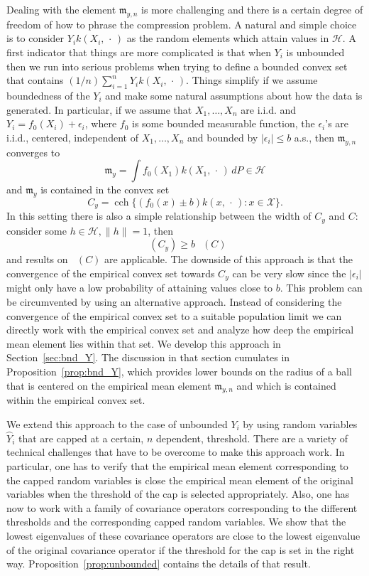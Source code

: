 \documentclass[10pt]{amsart}
\theoremstyle{definition}\newtheorem{defi}[theo]{Definition}\newtheorem{rema}[theo]{Remark}\newtheorem{exam}[theo]{Example}\newtheorem{exem}[theo]{Example}\newtheorem{nota}[theo]{Notation}
\theoremstyle{remark}
\DeclareMathOperator{\cch}{cch}
\DeclareMathOperator{\diamh}{{width}_h}
\newcommand{\X}{\mathcal{X}}
\newcommand{\cH}{\mathcal{H}}
\newcommand{\mean}{\mathfrak{m}}
\begin{document}
Dealing with the element $\mean_{y,n}$ is more challenging and there is a certain degree of freedom of how to phrase the compression problem. A natural and simple choice is to consider $Y_i k(X_i,\,\cdot\,)$ as the random elements which attain values in $\cH$. A first indicator that things are more complicated is that when $Y_i$ is unbounded then we run into serious problems when trying to define a bounded convex set that contains $(1/n) \sum_{i=1}^n Y_i k(X_i,\,\cdot\,)$. Things simplify if we assume boundedness of the $Y_i$ and make some natural assumptions about how the data is generated. In particular, if we assume that $X_1,\dots, X_n$ are i.i.d. and $Y_i = f_0(X_i) + \epsilon_i$, where $f_0$ is some bounded measurable function, the $\epsilon_i$'s are i.i.d., centered, independent of $X_1,\dots, X_n$ and bounded by $|\epsilon_i | \leq b$ a.s., then $\mean_{y,n}$ converges to
\[
\mean_y = \int f_0(X_1) k(X_1,\,\cdot\,) \, dP \in \cH
\]
and $\mean_y$ is contained in the convex set
\[
C_y = \cch \{ (f_0(x) \pm b) k(x,\,\cdot\,): x\in \X \}.
\]
In this setting there is also a simple relationship between the width of $C_y$ and $C$: consider some $h\in \cH, \|h\|=1$, then
\[
\diamh (C_y) \geq b \, \diamh(C)
\]
and results on $\diamh(C)$ are applicable. The downside of this approach is that the convergence of the empirical convex set towards $C_y$ can be very slow since the $|\epsilon_i|$ might only have a low probability of attaining values close to $b$. This problem can be circumvented by using an alternative approach. Instead of considering the convergence of the empirical convex set to a suitable population limit we can directly work with the empirical convex set and analyze how deep the empirical mean element lies within that set. We develop this approach in Section~\ref{sec:bnd_Y}. The discussion in that section cumulates in Proposition~\ref{prop:bnd_Y}, which provides lower bounds on the radius of a ball that is centered on the empirical mean element $\mean_{y,n}$ and which is contained within the empirical convex set.

We extend this approach to the case of unbounded $Y_i$ by using random variables~$\wideparen{Y}_i$ that are capped at a certain, $n$ dependent, threshold. There are a variety of technical challenges that have to be overcome to make this approach work. In particular, one has to verify that the empirical mean element corresponding to the capped random variables is close the empirical mean element of the original variables when the threshold of the cap is selected appropriately. Also, one has now to work with a family of covariance operators corresponding to the different thresholds and the corresponding capped random variables. We show that the lowest eigenvalues of these covariance operators are close to the lowest eigenvalue of the original covariance operator if the threshold for the cap is set in the right way. Proposition~\ref{prop:unbounded} contains the details of that result.
\end{document}
